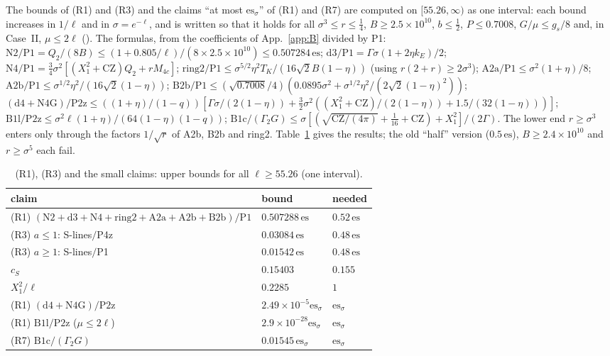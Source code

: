 The bounds of (R1) and (R3) and the claims ``at most $\mathrm{es}_\sigma$'' of (R1) and (R7) are computed on $[55.26,\infty)$ as one interval: each bound increases in $1/\ell$ and in $\sigma=e^{-\ell}$, and is written so that it holds for all $\sigma^3\le r\le\frac14$, $B\ge2.5\times10^{10}$, $b\le\frac12$, $P\le0.7008$, $G/\mu\le g_s/8$ and, in Case~II, $\mu\le2\ell$ ().
The formulas, from the coefficients of App.~\ref{app:B} divided by P1:
$\mathrm{N2}/\mathrm{P1}=Q_2/(8B)\le(1+0.805/\ell)/(8\times2.5\times10^{10})\le0.507284\,\mathrm{es}$;
$\mathrm{d3}/\mathrm{P1}=\Gamma\sigma(1+2\eta k_E)/2$;
$\mathrm{N4}/\mathrm{P1}=\frac34\sigma^2[(X_1^2+\mathrm{CZ})Q_2+rM_{4c}]$;
$\mathrm{ring2}/\mathrm{P1}\le\sigma^{5/2}\eta^2T_K/(16\sqrt2B(1-\eta))$ (using $r(2+r)\ge2\sigma^3$);
$\mathrm{A2a}/\mathrm{P1}\le\sigma^2(1+\eta)/8$;
$\mathrm{A2b}/\mathrm{P1}\le\sigma^{1/2}\eta^2/(16\sqrt2(1-\eta))$;
$\mathrm{B2b}/\mathrm{P1}\le(\sqrt{0.7008}/4)(0.0895\sigma^2+\sigma^{1/2}\eta^2/(2\sqrt2(1-\eta)^2))$;
$(\mathrm{d4}+\mathrm{N4G})/\mathrm{P2z}\le((1+\eta)/(1-q))[\Gamma\sigma/(2(1-\eta))+\frac32\sigma^2((X_1^2+\mathrm{CZ})/(2(1-\eta))+1.5/(32(1-\eta)))]$;
$\mathrm{B1l}/\mathrm{P2z}\le\sigma^2\ell(1+\eta)/(64(1-\eta)(1-q))$;
$\mathrm{B1c}/(\Gamma_2G)\le\sigma[(\sqrt{\mathrm{CZ}/(4\pi)}+\frac1{16}+\mathrm{CZ})+X_1^2]/(2\Gamma)$.
The lower end $r\ge\sigma^3$ enters only through the factors $1/\sqrt r$ of A2b, B2b and ring2.
Table~\ref{tab:R1R3} gives the results; the old ``half'' version ($0.5\,\mathrm{es}$), $B\ge2.4\times10^{10}$ and $r\ge\sigma^5$ each fail.

\begin{table}
\caption{(R1), (R3) and the small claims: upper bounds for all $\ell\ge55.26$ (one interval).}
\label{tab:R1R3}
\begin{ruledtabular}
\small
\begin{tabular}{p{}p{}p{}}
claim & bound & needed\\ \hline
(R1) $(\mathrm{N2}+\mathrm{d3}+\mathrm{N4}+\mathrm{ring2}+\mathrm{A2a}+\mathrm{A2b}+\mathrm{B2b})/\mathrm{P1}$ & $0.507288\,\mathrm{es}$ & $0.52\,\mathrm{es}$\\
(R3) $a\le1$: S-lines$/$P4z & $0.03084\,\mathrm{es}$ & $0.48\,\mathrm{es}$\\
(R3) $a\ge1$: S-lines$/$P1 & $0.01542\,\mathrm{es}$ & $0.48\,\mathrm{es}$\\
$c_S$ & $0.15403$ & $0.155$\\
$X_1^2/\ell$ & $0.2285$ & $1$\\
(R1) $(\mathrm{d4}+\mathrm{N4G})/\mathrm{P2z}$ & $2.49\times10^{-5}\mathrm{es}_\sigma$ & $\mathrm{es}_\sigma$\\
(R1) $\mathrm{B1l}/\mathrm{P2z}$ ($\mu\le2\ell$) & $2.9\times10^{-28}\mathrm{es}_\sigma$ & $\mathrm{es}_\sigma$\\
(R7) $\mathrm{B1c}/(\Gamma_2G)$ & $0.01545\,\mathrm{es}_\sigma$ & $\mathrm{es}_\sigma$\\
\end{tabular}
\end{ruledtabular}
\end{table}

